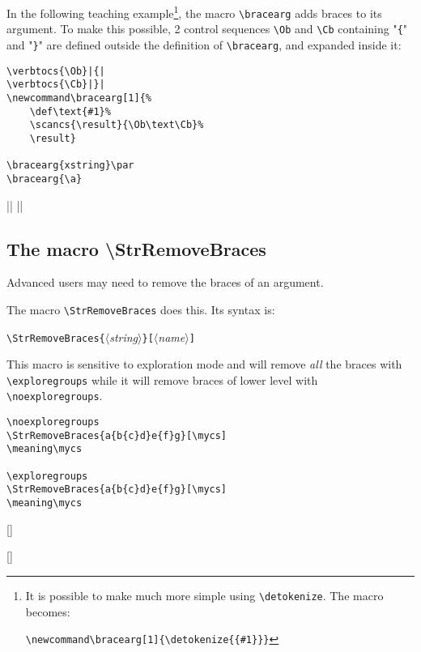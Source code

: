 \documentclass[english,a4paper,10pt]{article}
\newcommand\argu[1]{$\langle$\textit{#1}$\rangle$}
\newcommand\ARGU[1]{\texttt{\{}\argu{#1}\texttt{\}}}
\newcommand\arguC[1]{\texttt{[}\argu{#1}\texttt{]}}
\newcommand\styleexercice{\footnotesize}
\newcommand\verbinline{\lstinline[basicstyle=\normalsize\ttfamily]}
\begin{document}
In the following teaching example\footnote{It is possible to make much more simple using \texttt{\textbackslash detokenize}. The macro becomes:\par\texttt{\textbackslash newcommand\textbackslash bracearg[1]\{\textbackslash detokenize\{\{\#1\}\}\}}}, the macro \verb|\bracearg| adds braces to its argument. To make this possible, 2 control sequences \verb|\Ob| and \verb|\Cb| containing "\verb|{|" and "\verb|}|" are defined outside the definition of \verb|\bracearg|, and expanded inside it:\par\nobreak\medskip
\begin{minipage}[c]{0.65\linewidth}
\begin{lstlisting}
\verbtocs{\Ob}|{|
\verbtocs{\Cb}|}|
\newcommand\bracearg[1]{%
	\def\text{#1}%
	\scancs{\result}{\Ob\text\Cb}%
	\result}

\bracearg{xstring}\par
\bracearg{\a}
\end{lstlisting}%
\end{minipage}\hfill
\begin{minipage}[c]{0.35\linewidth}
	\styleexercice
	\verbtocs{\Ob}|{|
	\verbtocs{\Cb}|}|
	\newcommand\bracearg[1]{%
		\def\text{#1}%
		\scancs{\result}{\Ob\text\Cb}%
		\result}

	\bracearg{xstring}\par
	\bracearg{\a}
\end{minipage}%

\subsection{The macro \ttfamily\textbackslash StrRemoveBraces}
Advanced users may need to remove the braces of an argument.

The macro \verbinline|\StrRemoveBraces| does this. Its syntax is:\smallskip

\verbinline|\StrRemoveBraces|\ARGU{string}\arguC{name}
\smallskip

This macro is sensitive to exploration mode and will remove \emph{all} the braces with \verbinline|\exploregroups| while it will remove braces of lower level with \verbinline|\noexploregroups|.\medskip

\begin{minipage}[c]{0.65\linewidth}
\begin{lstlisting}
\noexploregroups
\StrRemoveBraces{a{b{c}d}e{f}g}[\mycs]
\meaning\mycs

\exploregroups
\StrRemoveBraces{a{b{c}d}e{f}g}[\mycs]
\meaning\mycs
\end{lstlisting}%
\end{minipage}\hfill
\begin{minipage}[c]{0.35\linewidth}
	\styleexercice
	\noexploregroups
	[\mycs]
	\meaning\mycs

	\exploregroups
	[\mycs]
	\meaning\mycs
\end{minipage}%
\end{document}
